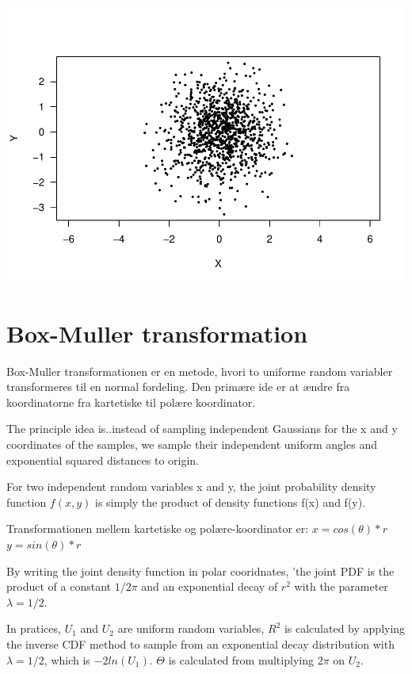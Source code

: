 \documentclass[
]{article}
\begin{document}
\includegraphics{TP2_files/figure-latex/unnamed-chunk-4-1.pdf}

\hypertarget{box-muller-transformation}{%
\section{Box-Muller transformation}\label{box-muller-transformation}}

Box-Muller transformationen er en metode, hvori to uniforme random
variabler transformeres til en normal fordeling. Den primære ide er at
ændre fra koordinatorne fra kartetiske til polære koordinator.

The principle idea is..instead of sampling independent Gaussians for the
x and y coordinates of the samples, we sample their independent uniform
angles and exponential squared distances to origin.

For two independent random variables x and y, the joint probability
density function \(f(x,y)\) is simply the product of density functions
f(x) and f(y).

Transformationen mellem kartetiske og polære-koordinator er:
\(x = cos(\theta)*r\) \(y = sin(\theta)*r\)

By writing the joint density function in polar cooridnates, 'the joint
PDF is the product of a constant \(1/2\pi\) and an exponential decay of
\(r^2\) with the parameter \(\lambda = 1/2\).

In pratices, \(U_1\) and \(U_2\) are uniform random variables, \(R^2\)
is calculated by applying the inverse CDF method to sample from an
exponential decay distribution with \(\lambda = 1/2\), which is
\(-2ln(U_1)\). \(\Theta\) is calculated from multiplying \(2\pi\) on
\(U_2\).
\end{document}
